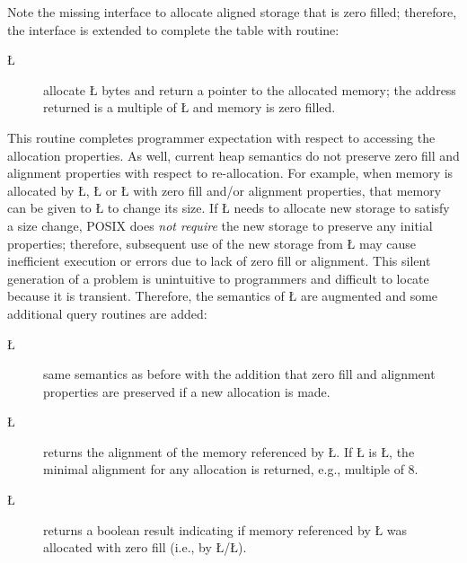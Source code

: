 \documentclass[openright,twoside]{report}
\begin{document}
Note the missing interface to allocate aligned storage that is zero filled;
therefore, the interface is extended to complete the table with routine:
\begin{description}
\item[\LGinlinetrue\LGbegin\lgrinde\L{}\endlgrinde\LGend{}] allocate \LGinlinetrue\LGbegin\lgrinde\L{}\endlgrinde\LGend{} bytes and return a pointer to the allocated memory; the address returned is a multiple of \LGinlinetrue\LGbegin\lgrinde\L{}\endlgrinde\LGend{} and memory is zero filled.
\end{description}
This routine completes programmer expectation with respect to accessing the allocation properties.
As well, current heap semantics do not preserve zero fill and alignment properties with respect to re-allocation.
For example, when memory is allocated by \LGinlinetrue\LGbegin\lgrinde\L{}\endlgrinde\LGend{}, \LGinlinetrue\LGbegin\lgrinde\L{}\endlgrinde\LGend{} or \LGinlinetrue\LGbegin\lgrinde\L{}\endlgrinde\LGend{} with zero fill and/or alignment properties, that memory can be given to \LGinlinetrue\LGbegin\lgrinde\L{}\endlgrinde\LGend{} to change its size.
If \LGinlinetrue\LGbegin\lgrinde\L{}\endlgrinde\LGend{} needs to allocate new storage to satisfy a size change, POSIX does \emph{not require} the new storage to preserve any initial properties;
therefore, subsequent use of the new storage from \LGinlinetrue\LGbegin\lgrinde\L{}\endlgrinde\LGend{} may cause inefficient execution or errors due to lack of zero fill or alignment.
This silent generation of a problem is unintuitive to programmers and difficult to locate because it is transient.
Therefore, the semantics of \LGinlinetrue\LGbegin\lgrinde\L{}\endlgrinde\LGend{} are augmented and some additional query routines are added:
\begin{description}
\item[\LGinlinetrue\LGbegin\lgrinde\L{}\endlgrinde\LGend{}] same semantics as before with the addition that zero fill and alignment properties are preserved if a new allocation is made.
\item[\LGinlinetrue\LGbegin\lgrinde\L{}\endlgrinde\LGend{}] returns the alignment of the memory referenced by \LGinlinetrue\LGbegin\lgrinde\L{}\endlgrinde\LGend{}.
If \LGinlinetrue\LGbegin\lgrinde\L{}\endlgrinde\LGend{} is \LGinlinetrue\LGbegin\lgrinde\L{}\endlgrinde\LGend{}, the minimal alignment for any allocation is returned, e.g., multiple of 8.
\item[\LGinlinetrue\LGbegin\lgrinde\L{}\endlgrinde\LGend{}] returns a boolean result indicating if memory referenced by \LGinlinetrue\LGbegin\lgrinde\L{}\endlgrinde\LGend{} was allocated with zero fill (i.e., by \LGinlinetrue\LGbegin\lgrinde\L{}\endlgrinde\LGend{}/\LGinlinetrue\LGbegin\lgrinde\L{}\endlgrinde\LGend{}).
\end{description}
\end{document}
